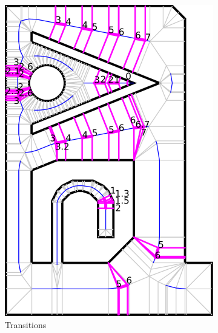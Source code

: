 \begin{figure}
\begin{subfigure}{\figwidth}
\includegraphics[width=\columnwidth]{sources/method/overview/transitions.pdf}
\caption{Transitions}\label{overview_fig_transitions}
\end{subfigure}
\begin{subfigure}{\figwidth}
\centering

\end{subfigure}
\end{figure}
